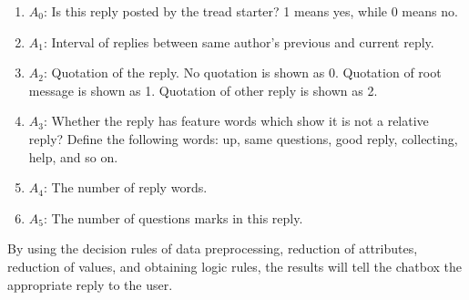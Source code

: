 \documentclass[11pt,technote,twocolumn]{IEEEtran}
\begin{document}
\begin{enumerate}
    \item $A_0$: Is this reply posted by the tread starter? 1 means yes, while 0 means no.
    \item $A_1$: Interval of replies between same author's previous and current reply.
    \item $A_2$: Quotation of the reply. No quotation is shown as 0. Quotation of root message is shown as 1. Quotation of other reply is shown as 2.
    \item $A_3$: Whether the reply has feature words which show it is not a relative reply? Define the following words: up, same questions, good reply, collecting, help, and so on.
    \item $A_4$: The number of reply words.
    \item $A_5$: The number of questions marks in this reply.
\end{enumerate}
By using the decision rules of data preprocessing, reduction of attributes, reduction of values, and obtaining logic rules, the results will tell the chatbox the appropriate reply to the user. \cite{4663330}
\end{document}
